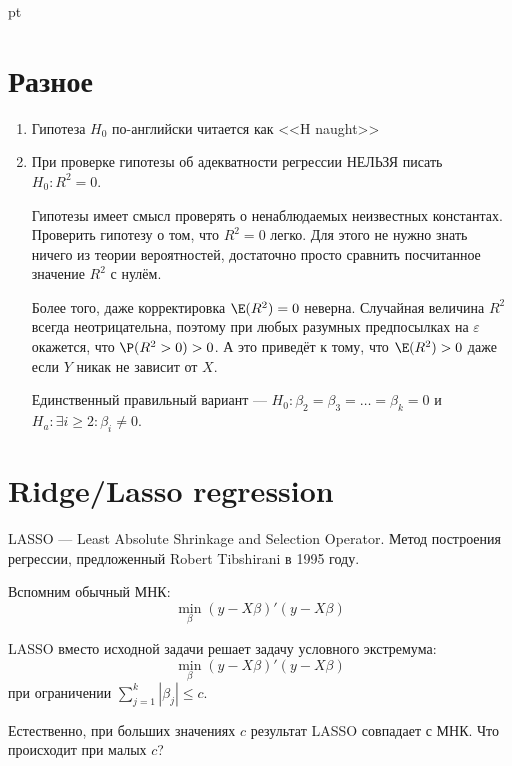 \documentclass[pdftex,12pt,a4paper]{article}
\begin{document}
 pt %

\listoftodos


\section{Разное}
\begin{enumerate}
\item Гипотеза $H_0$ по-английски читается как <<H naught>>
\item При проверке гипотезы об адекватности регрессии НЕЛЬЗЯ писать $H_0: R^2=0$. 


Гипотезы имеет смысл проверять о ненаблюдаемых неизвестных константах. 
Проверить гипотезу о том, что $R^2=0$ легко. 
Для этого не нужно знать ничего из теории вероятностей, достаточно просто сравнить посчитанное значение $R^2$ с нулём. 

Более того, даже корректировка $\E(R^2)=0$ неверна. 
Случайная величина $R^2$ всегда неотрицательна, поэтому при любых разумных предпосылках на $\varepsilon$ окажется, что $\P(R^2>0)>0$. 
А это приведёт к тому, что $\E(R^2)>0$ даже если $Y$ никак не зависит от $X$.


Единственный правильный вариант --- $H_0: \beta_2=\beta_3=\ldots=\beta_k=0$ и $H_a: \exists i\geq 2 : \beta_i\neq 0$.
\end{enumerate}



\section{Ridge/Lasso regression}

LASSO --- Least Absolute Shrinkage and Selection Operator. Метод построения регрессии, предложенный Robert Tibshirani в 1995 году.

Вспомним обычный МНК:
\begin{equation}
\min_{\beta} (y-X\beta)'(y-X\beta)
\end{equation}


LASSO вместо исходной задачи решает задачу условного экстремума:
\begin{equation}
\min_{\beta} (y-X\beta)'(y-X\beta)
\end{equation}
при ограничении $\sum_{j=1}^{k}|\beta_j|\leq c$.


Естественно, при больших значениях $c$ результат LASSO совпадает с МНК. Что происходит при малых $c$?
\end{document}
